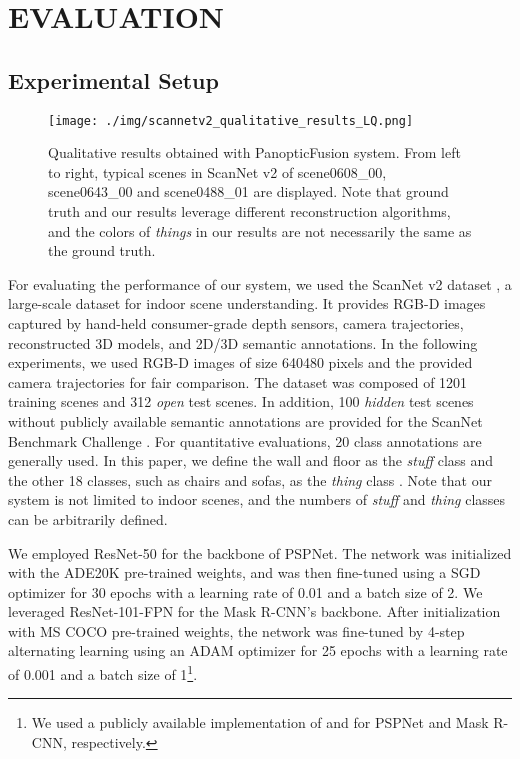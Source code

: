 \documentclass[letterpaper, 10pt, conference]{latex_template/ieeeconf}
\begin{document}
\section{EVALUATION}
\subsection{Experimental Setup}
\begin{figure*}[t]
   \centering
      \texttt{[image: ./img/scannetv2\_qualitative\_results\_LQ.png]}
      \caption{Qualitative results obtained with PanopticFusion system. From left to right, typical scenes in ScanNet v2 of scene0608\_00, scene0643\_00 and scene0488\_01 are displayed. Note that ground truth and our results leverage different reconstruction algorithms, and the colors of {\it things} in our results are not necessarily the same as the ground truth.}
      \label{fig_qualitative_results}
\end{figure*}

For evaluating the performance of our system, we used the ScanNet v2 dataset \cite{dai2017scannet}, 
a large-scale dataset for indoor scene understanding.
It provides RGB-D images captured by hand-held consumer-grade depth sensors, camera trajectories, reconstructed 3D models, and 2D/3D semantic annotations.
In the following experiments, we used RGB-D images of size 640480 pixels and the provided camera trajectories for fair comparison.
The dataset was composed of 1201 training scenes and 312 {\it open} test scenes.
In addition, 100 {\it hidden} test scenes without publicly available semantic annotations are provided for the ScanNet Benchmark Challenge \cite{scannet_benchmark_challenge}. 
For quantitative evaluations, 20 class annotations are generally used.
In this paper, we define the wall and floor as the {\it stuff} class  and the other 18 classes, such as chairs and sofas, as the {\it thing} class . 
Note that our system is not limited to indoor scenes, and the numbers of {\it stuff} and {\it thing} classes can be arbitrarily defined.

We employed ResNet-50 for the backbone of PSPNet. The network was initialized with the ADE20K \cite{zhou2016semantic} pre-trained weights, and was then fine-tuned using a SGD optimizer for 30 epochs with a learning rate of 0.01 and a batch size of 2.
We leveraged ResNet-101-FPN for the Mask R-CNN's backbone. After initialization with MS COCO \cite{lin2014microsoft} pre-trained weights, the network was fine-tuned by 4-step alternating learning \cite{ren2015faster} using an ADAM optimizer for 25 epochs with a learning rate of 0.001 and a batch size of 1\footnote{We used a publicly available implementation of \cite{pspnet_keras_tensorflow} and \cite{matterport_maskrcnn_2017} for PSPNet and Mask R-CNN, respectively.}.
\end{document}
